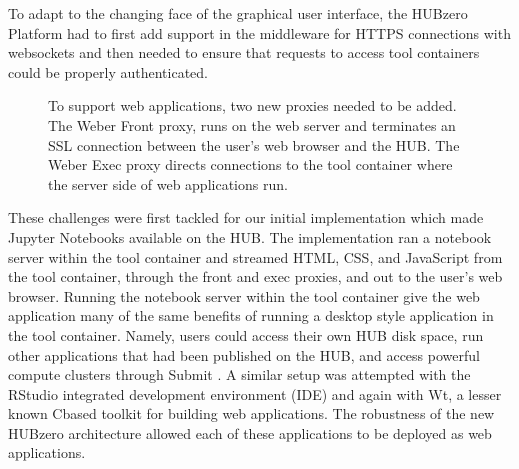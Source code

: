\documentclass[conference]{../sty/IEEEtran}
\newcommand\CC{C\nolinebreak[4]\hspace{-.05em}\raisebox{.4ex}{\relsize{-3}{\textbf{++}}}\hspace{.25em}}
\begin{document}
To adapt to the changing face of the graphical user interface, the HUBzero
Platform had to first add support in the middleware for HTTPS connections with
websockets and then needed to ensure that requests to access tool containers
could be properly authenticated.

\begin{figure}[H]
  \centering
  \caption{To support web applications, two new proxies needed to be added.
The Weber Front proxy, runs on the web server and terminates an SSL connection
between the user's web browser and the HUB. The Weber Exec proxy directs
connections to the tool container where the server side of web applications
 run.}
  \label{fig_arch}
\end{figure}



These challenges were first tackled for our initial implementation which made
Jupyter Notebooks available on the HUB. The implementation ran a notebook
server within the tool container and streamed HTML, CSS, and JavaScript from
the tool container, through the front and exec proxies, and out to the user's
web browser. Running the notebook server within the tool container give the web
application many of the same benefits of running a desktop style application in
the tool container. Namely, users could access their own HUB disk space, run
other applications that had been published on the HUB, and access powerful
compute clusters through Submit \cite{submit}. A similar setup was attempted
with the RStudio integrated development environment (IDE) and again with Wt, a
lesser known \CC based toolkit for building web applications. The robustness of
the new HUBzero architecture allowed each of these applications to be deployed
as web applications.
\end{document}
